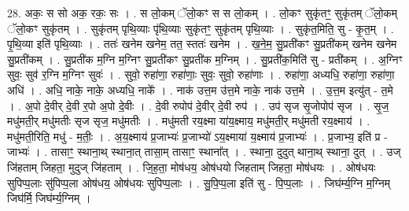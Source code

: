 \documentclass[17pt]{extarticle}
\begin{document}
28. अकः॒ स सो अक॒ रकः॒ सः । . स लो॒कम् ॅलो॒कꣳ स स लो॒कम् । . लो॒कꣳ सुकृ॑तꣳ॒॒ सुकृ॑तम् ॅलो॒कम् ॅलो॒कꣳ सुकृ॑तम् । . सुकृ॑तम् पृथि॒व्याः पृ॑थि॒व्याः सुकृ॑तꣳ॒॒ सुकृ॑तम् पृथि॒व्याः । . सुकृ॑त॒मिति॒ सु - कृ॒त॒म् । . पृ॒थि॒व्या इति॑ पृथि॒व्याः । . ततः॑ खनेम खनेम॒ तत॒ स्ततः॑ खनेम । . ख॒ने॒म॒ सु॒प्रती॑कꣳ सु॒प्रती॑कम् खनेम खनेम सु॒प्रती॑कम् । . सु॒प्रती॑क म॒ग्नि म॒ग्निꣳ सु॒प्रती॑कꣳ सु॒प्रती॑क म॒ग्निम् । . सु॒प्रती॑क॒मिति॑ सु - प्रती॑कम् । . अ॒ग्निꣳ सुवः॒ सुव॑ र॒ग्नि म॒ग्निꣳ सुवः॑ । . सुवो॒ रुहा॑णा॒ रुहा॑णाः॒ सुवः॒ सुवो॒ रुहा॑णाः । . रुहा॑णा॒ अध्यधि॒ रुहा॑णा॒ रुहा॑णा॒ अधि॑ । . अधि॒ नाके॒ नाके॒ अध्यधि॒ नाके᳚ । . नाक॑ उत्त॒म उ॑त्त॒मे नाके॒ नाक॑ उत्त॒मे । . उ॒त्त॒म इत्यु॑त् - त॒मे । . अ॒पो दे॒वीर् दे॒वी र॒पो अ॒पो दे॒वीः । . दे॒वी रुपोप॑ दे॒वीर् दे॒वी रुप॑ । . उप॑ सृज सृ॒जोपोप॑ सृज । . सृ॒ज॒ मधु॑मती॒र् मधु॑मतीः सृज सृज॒ मधु॑मतीः । . मधु॑मती रय॒क्ष्मा या॑य॒क्ष्माय॒ मधु॑मती॒र् मधु॑मती रय॒क्ष्माय॑ । . मधु॑मती॒रिति॒ मधु॑ - म॒तीः॒ । . अ॒य॒क्ष्माय॑ प्र॒जाभ्यः॑ प्र॒जाभ्यो॑ ऽय॒क्ष्माया॑ य॒क्ष्माय॑ प्र॒जाभ्यः॑ । . प्र॒जाभ्य॒ इति॑ प्र - जाभ्यः॑ । . तासाꣳ॒॒ स्थाना॒थ् स्थाना॒त् तासा॒म् तासाꣳ॒॒ स्थाना᳚त् । . स्थाना॒ दुदुत् थाना॒थ् स्थाना॒ दुत् । . उज् जि॑हताम् जिहता॒ मुदुज् जि॑हताम् । . जि॒ह॒ता॒ मोष॑धय॒ ओष॑धयो जिहताम् जिहता॒ मोष॑धयः । . ओष॑धयः सुपिप्प॒लाः सु॑पिप्प॒ला ओष॑धय॒ ओष॑धयः सुपिप्प॒लाः । . सु॒पि॒प्प॒ला इति॑ सु - पि॒प्प॒लाः । . जिघ॑र्म्य॒ग्नि म॒ग्निम् जिघ॑र्मि॒ जिघ॑र्म्य॒ग्निम् । \newline
\end{document}
